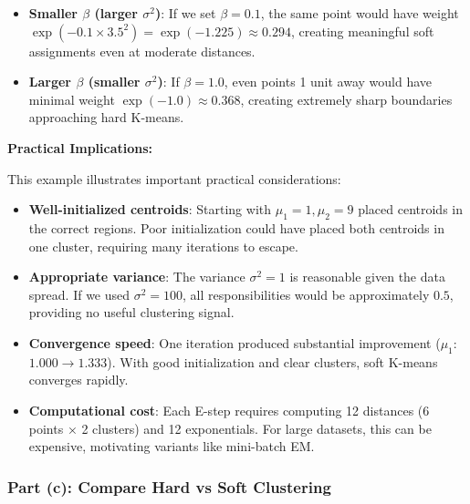 \documentclass[12pt]{article}
\begin{document}
\begin{explanation}
\begin{itemize}
    \item \textbf{Smaller $\beta$ (larger $\sigma^2$)}: If we set $\beta = 0.1$, the same point would have weight $\exp(-0.1 \times 3.5^2) = \exp(-1.225) \approx 0.294$, creating meaningful soft assignments even at moderate distances.

    \item \textbf{Larger $\beta$ (smaller $\sigma^2$)}: If $\beta = 1.0$, even points 1 unit away would have minimal weight $\exp(-1.0) \approx 0.368$, creating extremely sharp boundaries approaching hard K-means.
\end{itemize}

\textbf{Practical Implications:}

This example illustrates important practical considerations:

\begin{itemize}
    \item \textbf{Well-initialized centroids}: Starting with $\mu_1 = 1, \mu_2 = 9$ placed centroids in the correct regions. Poor initialization could have placed both centroids in one cluster, requiring many iterations to escape.

    \item \textbf{Appropriate variance}: The variance $\sigma^2 = 1$ is reasonable given the data spread. If we used $\sigma^2 = 100$, all responsibilities would be approximately $0.5$, providing no useful clustering signal.

    \item \textbf{Convergence speed}: One iteration produced substantial improvement ($\mu_1$: $1.000 \to 1.333$). With good initialization and clear clusters, soft K-means converges rapidly.

    \item \textbf{Computational cost}: Each E-step requires computing 12 distances (6 points × 2 clusters) and 12 exponentials. For large datasets, this can be expensive, motivating variants like mini-batch EM.
\end{itemize}

\end{explanation}

\subsubsection{Part (c): Compare Hard vs Soft Clustering}
\end{document}
